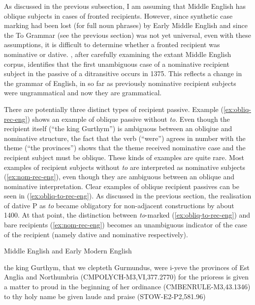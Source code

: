 	As discussed in the previous subsection, I am assuming that Middle English has oblique subjects in cases of fronted recipients. However, since synthetic case marking had been lost (for full noun phrases) by Early Middle English and since the To Grammar (see the previous section) was not yet universal, even with these assumptions, it is difficult to determine whether a fronted recipient was nominative or dative. \cite{Allen.1999}, after carefully examining the extant Middle English corpus, identifies that the first unambiguous case of a nominative recipient subject in the passive of a ditransitive occurs in 1375. This reflects a change in the grammar of English, in so far as previously nominative recipient subjects were ungrammatical and now they are grammatical.

	There are potentially three distinct types of recipient passive. Example (\ref{ex:obliq-rec-eng}) shows an example of oblique passive without \textit{to}. Even though the recipient itself (``the king Gurthym'') is ambiguous between an obliqiue and nominative structure, the fact that the verb (``were'') agrees in number with the theme (``the provinces'') shows that the theme received nominative case and the recipient subject must be oblique. These kinds of examples are quite rare. Most examples of recipient subjects without \textit{to} are interpreted as nominative subjects (\ref{ex:nom-rec-eng}), even though they are ambiguous between an oblique and nominative interpretation. Clear examples of oblique recipient passives can be seen in (\ref{ex:obliq-to-rec-eng}). As discussed in the previous section, the realisation of dative P as \textit{to} became obligatory for non-adjacent constructions by about 1400. At that point, the distinction between \textit{to}-marked (\ref{ex:obliq-to-rec-eng}) and bare recipients (\ref{ex:nom-rec-eng}) becomes an unambiguous indicator of the case of the recipient (namely dative and nominative respectively).

	\begin{exe}
		\ex Middle English \citep{Kroch.2000} and Early Modern English \citep{Kroch.2004}
		\begin{xlist}
			\ex\label{ex:obliq-rec-eng} the king Gurthym, that we clepteth Gurmundus, were i-yeve the provinces of Est Anglia and Northumbria (CMPOLYCH-M3,VI,377.2770)
			\ex\label{ex:nom-rec-eng} for the prioress is given a matter to proud in the beginning of her ordinance (CMBENRULE-M3,43.1346)
			\ex\label{ex:obliq-to-rec-eng} to thy holy name be given laude and praise (STOW-E2-P2,581.96)
		\end{xlist}
	\end{exe}

